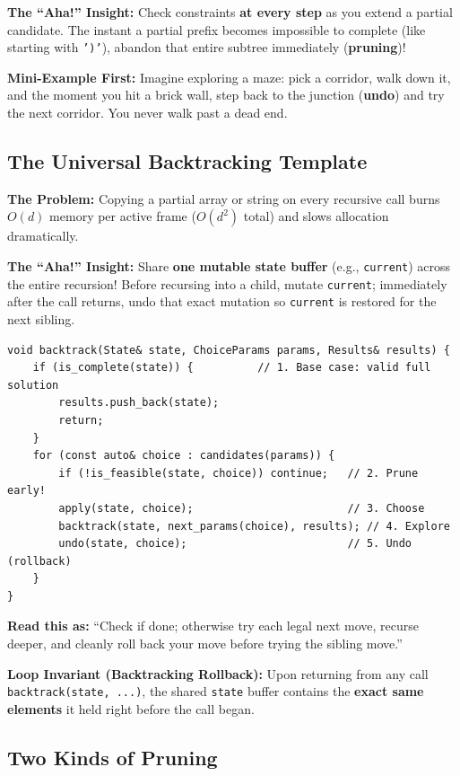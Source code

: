 \documentclass[11pt,a4paper]{article}
\theoremstyle{definition}
\newcommand{\painbeat}{\textbf{\color{accentamber}The Problem:} }
\newcommand{\ahabeat}{\textbf{\color{accentteal}The ``Aha!'' Insight:} }
\newcommand{\examplebeat}{\textbf{\color{primaryblue}Mini-Example First:} }
\newcommand{\invariantbeat}[1]{\par\noindent\textbf{\color{accentteal}Loop Invariant (#1):} }
\begin{document}
\ahabeat Check constraints \textbf{at every step} as you extend a partial candidate. The instant a partial prefix becomes impossible to complete (like starting with \texttt{')'}), abandon that entire subtree immediately (\textbf{pruning})!

\examplebeat Imagine exploring a maze: pick a corridor, walk down it, and the moment you hit a brick wall, step back to the junction (\textbf{undo}) and try the next corridor. You never walk past a dead end.

\subsection{The Universal Backtracking Template}

\painbeat Copying a partial array or string on every recursive call burns $O(d)$ memory per active frame ($O(d^2)$ total) and slows allocation dramatically.

\ahabeat Share \textbf{one mutable state buffer} (e.g., \texttt{current}) across the entire recursion! Before recursing into a child, mutate \texttt{current}; immediately after the call returns, undo that exact mutation so \texttt{current} is restored for the next sibling.

\begin{formulabox}
\begin{verbatim}
void backtrack(State& state, ChoiceParams params, Results& results) {
    if (is_complete(state)) {          // 1. Base case: valid full solution
        results.push_back(state);
        return;
    }
    for (const auto& choice : candidates(params)) {
        if (!is_feasible(state, choice)) continue;   // 2. Prune early!
        apply(state, choice);                        // 3. Choose
        backtrack(state, next_params(choice), results); // 4. Explore
        undo(state, choice);                         // 5. Undo (rollback)
    }
}
\end{verbatim}
\textbf{Read this as:} ``Check if done; otherwise try each legal next move, recurse deeper, and cleanly roll back your move before trying the sibling move.''
\end{formulabox}

\invariantbeat{Backtracking Rollback} Upon returning from any call \texttt{backtrack(state, ...)}, the shared \texttt{state} buffer contains the \textbf{exact same elements} it held right before the call began.

\subsection{Two Kinds of Pruning}
\end{document}
